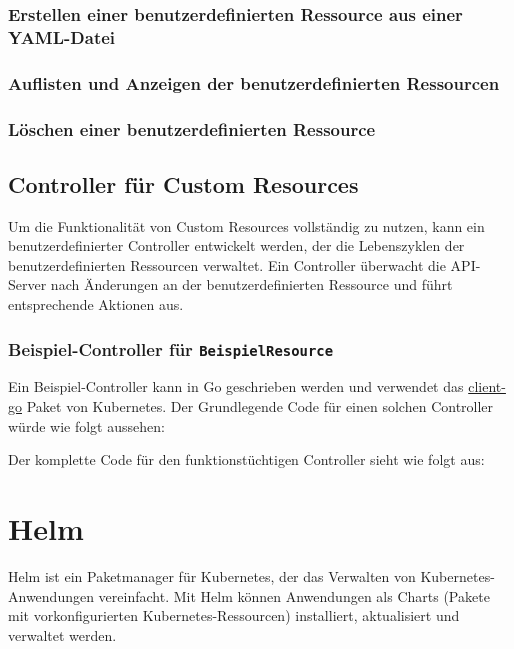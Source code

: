 \subsubsection{Erstellen einer benutzerdefinierten Ressource aus einer YAML-Datei}


\subsubsection{Auflisten und Anzeigen der benutzerdefinierten Ressourcen}


\subsubsection{Löschen einer benutzerdefinierten Ressource}

\newpage
\subsection{Controller für Custom Resources}
Um die Funktionalität von Custom Resources vollständig zu nutzen, kann ein benutzerdefinierter Controller entwickelt werden, der die Lebenszyklen der benutzerdefinierten Ressourcen verwaltet. Ein Controller überwacht die API-Server nach Änderungen an der benutzerdefinierten Ressource und führt entsprechende Aktionen aus.

\subsubsection{Beispiel-Controller für \texttt{BeispielResource}}
Ein Beispiel-Controller kann in Go geschrieben werden und verwendet das \href{https://github.com/kubernetes/client-go}{client-go} Paket von Kubernetes. Der Grundlegende Code für einen solchen Controller würde wie folgt aussehen:

\newpage
\noindent
Der komplette Code für den funktionstüchtigen Controller sieht wie folgt aus:


\newpage
\section{Helm}
Helm ist ein Paketmanager für Kubernetes, der das Verwalten von Kubernetes-Anwendungen vereinfacht. Mit Helm können Anwendungen als Charts (Pakete mit vorkonfigurierten Kubernetes-Ressourcen) installiert, aktualisiert und verwaltet werden.\\

